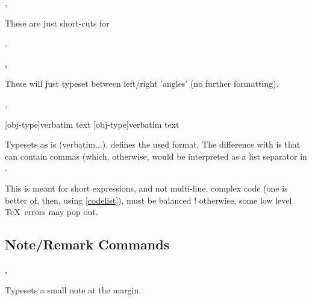 \documentclass{article}
\begin{document}
\begin{codedescribe}[code]{\typesetmacro,\tsmacro}
\begin{codesyntax}
\end{codesyntax}
These are just short-cuts for\par {}  .

\end{codedescribe}

\begin{codedescribe}[code]{\typesetmeta,\tsmeta}
\begin{codesyntax}
\end{codesyntax}
 These will just typeset  between left/right 'angles' (no further formatting).
 
\end{codedescribe}


\begin{codedescribe}[code]{\typesetverb,\tsverb}
\begin{codesyntax}
\tsmacro{\typesetverb}[obj-type]{verbatim text}
\tsmacro{\tsverb}[obj-type]{verbatim text}
\end{codesyntax}
 Typesets  as is (verbatim...).  defines the used format. The difference with  is that  can contain commas (which, otherwise, would be interpreted as a list separator in \tsobj{\tsobj}.
\end{codedescribe}
\begin{tsremark}
This is meant for short expressions, and not multi-line, complex code (one is better of, then, using \ref{codelist}).   must be balanced ! otherwise, some low level \TeX\ errors may pop out.
\end{tsremark}

\subsection{Note/Remark Commands}\label{note-commands}


\begin{codedescribe}[code]{\typesetmarginnote,\tsmarginnote}
\begin{codesyntax}
\end{codesyntax}
Typesets a small note at the margin.
\end{codedescribe}
\end{document}

